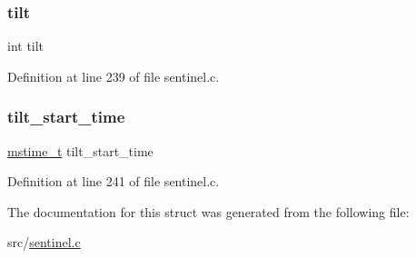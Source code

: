 \subsubsection{\texorpdfstring{tilt}{tilt}}
{\footnotesize\ttfamily int tilt}



Definition at line 239 of file sentinel.\+c.

\mbox{\label{structsentinel_state_a66a89864156f706449cf8956afd9205b}} 
\subsubsection{\texorpdfstring{tilt\+\_\+start\+\_\+time}{tilt\_start\_time}}
{\footnotesize\ttfamily \hyperlink{redismodule_8h_a652ae61e2475bc8957454534544968fc}{mstime\+\_\+t} tilt\+\_\+start\+\_\+time}



Definition at line 241 of file sentinel.\+c.



The documentation for this struct was generated from the following file\+:\begin{DoxyCompactItemize}
\item 
src/\hyperlink{sentinel_8c}{sentinel.\+c}\end{DoxyCompactItemize}
